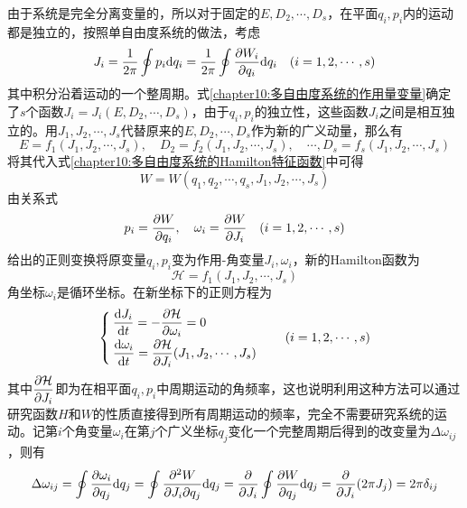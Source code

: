 由于系统是完全分离变量的，所以对于固定的$E,D_2,\cdots,D_s$，在平面$q_i,p_i$内的运动都是独立的，按照单自由度系统的做法，考虑
\begin{equation}
	J_i = \frac{1}{2\pi} \oint p_i\mathrm{d} q_i = \frac{1}{2\pi} \oint \frac{\partial W_i}{\partial q_i}\mathrm{d} q_i\quad (i=1,2,\cdots,s)
	\label{chapter10:多自由度系统的作用量变量}
\end{equation}
其中积分沿着运动的一个整周期。式\eqref{chapter10:多自由度系统的作用量变量}确定了$s$个函数$J_i=J_i(E,D_2,\cdots,D_s)$，由于$q_i,p_i$的独立性，这些函数$J_i$之间是相互独立的。用$J_1,J_2,\cdots,J_s$代替原来的$E,D_2,\cdots,D_s$作为新的广义动量，那么有
\begin{equation*}
	E = f_1(J_1,J_2,\cdots,J_s),\quad D_2 = f_2(J_1,J_2,\cdots,J_s),\quad \cdots,D_s = f_s(J_1,J_2,\cdots,J_s)
\end{equation*}
将其代入式\eqref{chapter10:多自由度系统的Hamilton特征函数}中可得
\begin{equation}
	W = W(q_1,q_2,\cdots,q_s,J_1,J_2,\cdots,J_s)
\end{equation}
由关系式
\begin{equation}
	p_i = \frac{\partial W}{\partial q_i},\quad \omega_i = \frac{\partial W}{\partial J_i}\quad (i=1,2,\cdots,s)
\end{equation}
给出的正则变换将原变量$q_i,p_i$变为作用-角变量$J_i,\omega_i$，新的Hamilton函数为
\begin{equation}
	\mathcal{H} = f_1(J_1,J_2,\cdots,J_s)
\end{equation}
角坐标$\omega_i$是循环坐标。在新坐标下的正则方程为
\begin{equation}
\begin{cases}
	\displaystyle \dfrac{\mathrm{d} J_i}{\mathrm{d} t} = -\dfrac{\partial \mathcal{H}}{\partial \omega_i} = 0 \\[1.5ex]
	\displaystyle \dfrac{\mathrm{d} \omega_i}{\mathrm{d} t} = \dfrac{\partial \mathcal{H}}{\partial J_i}(J_1,J_2,\cdots,J_s)
\end{cases}\quad (i=1,2,\cdots,s)
\end{equation}
其中$\dfrac{\partial \mathcal{H}}{\partial J_i}$即为在相平面$q_i,p_i$中周期运动的角频率，这也说明利用这种方法可以通过研究函数$H$和$W$的性质直接得到所有周期运动的频率，完全不需要研究系统的运动。记第$i$个角变量$\omega_i$在第$j$个广义坐标$q_j$变化一个完整周期后得到的改变量为$\Delta\omega_{ij}$，则有
\begin{align*}
	\Delta\omega_{ij} = \oint \frac{\partial \omega_i}{\partial q_j}\mathrm{d} q_j = \oint \frac{\partial^2 W}{\partial J_i\partial q_j} \mathrm{d} q_j = \frac{\partial}{\partial J_i} \oint \frac{\partial W}{\partial q_j}\mathrm{d} q_j = \frac{\partial}{\partial J_i} (2\pi J_j) = 2\pi\delta_{ij}
\end{align*}

